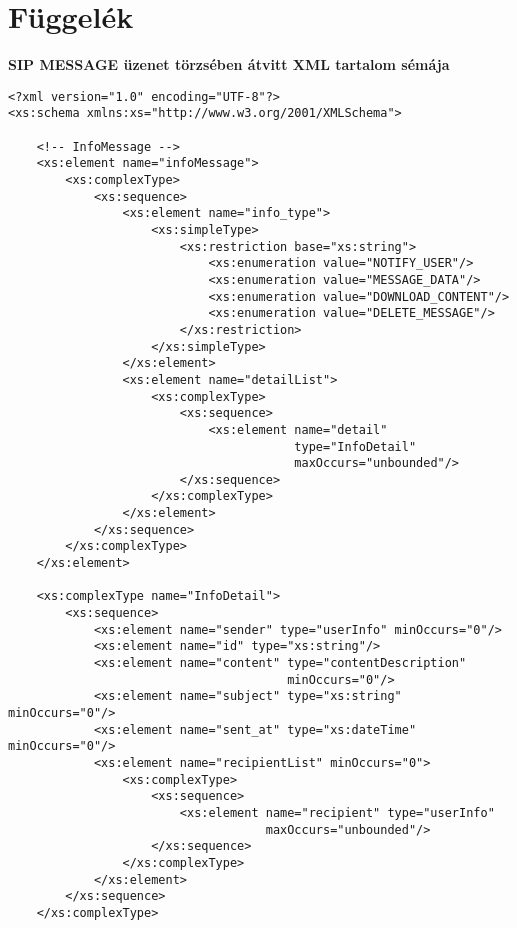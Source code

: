 
\appendix

\section{Függelék}
\label{sec:sip_message_xml_fuggelek}

\noindent
{\bf SIP MESSAGE üzenet törzsében átvitt XML tartalom sémája}
\fontsize{10}{10}
\begin{verbatim}
<?xml version="1.0" encoding="UTF-8"?>
<xs:schema xmlns:xs="http://www.w3.org/2001/XMLSchema">

    <!-- InfoMessage -->
    <xs:element name="infoMessage">
        <xs:complexType>
            <xs:sequence>              
                <xs:element name="info_type">
                    <xs:simpleType>
                        <xs:restriction base="xs:string">
                            <xs:enumeration value="NOTIFY_USER"/>
                            <xs:enumeration value="MESSAGE_DATA"/>
                            <xs:enumeration value="DOWNLOAD_CONTENT"/>
                            <xs:enumeration value="DELETE_MESSAGE"/>
                        </xs:restriction>
                    </xs:simpleType>
                </xs:element>
                <xs:element name="detailList">
                    <xs:complexType>
                        <xs:sequence>
                            <xs:element name="detail" 
                                        type="InfoDetail" 
                                        maxOccurs="unbounded"/>
                        </xs:sequence>
                    </xs:complexType>
                </xs:element>
            </xs:sequence>
        </xs:complexType>
    </xs:element>

    <xs:complexType name="InfoDetail">
        <xs:sequence>
            <xs:element name="sender" type="userInfo" minOccurs="0"/>      
            <xs:element name="id" type="xs:string"/>
            <xs:element name="content" type="contentDescription" 
                                       minOccurs="0"/>
            <xs:element name="subject" type="xs:string" minOccurs="0"/>
            <xs:element name="sent_at" type="xs:dateTime" minOccurs="0"/>
            <xs:element name="recipientList" minOccurs="0">
                <xs:complexType>
                    <xs:sequence>
                        <xs:element name="recipient" type="userInfo" 
                                    maxOccurs="unbounded"/>
                    </xs:sequence>
                </xs:complexType>
            </xs:element>
        </xs:sequence>
    </xs:complexType>
    

\end{verbatim}
